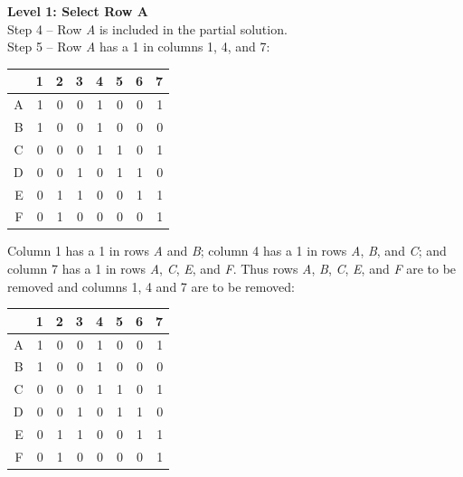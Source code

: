 \documentclass{mcmthesis}
\begin{document}
\textbf{Level 1: Select Row A} \\
\indent Step 4 -- Row \textit{A} is included in the partial solution.\\
\indent Step 5 -- Row \textit{A} has a 1 in columns 1, 4, and 7:

\begin{table}[ht]
\centering
	\begin{tabular}{|r|r|r|r|r|r|r|r|}
		\hline
		     & \textcolor[rgb]{0.00,0.00,0.98}1 & 2 & 3 & \textcolor[rgb]{0.00,0.00,0.98}4 & 5 & 6 & \textcolor[rgb]{0.00,0.00,0.98}7\\
		     \hline
		   \textcolor[rgb]{0.98,0.00,0.00}A & \textcolor[rgb]{0.98,0.00,0.00}1 & 0 & 0 & \textcolor[rgb]{0.98,0.00,0.00}1 & 0 & 0 & \textcolor[rgb]{0.98,0.00,0.00}1\\
		     \hline
		   B & 1 & 0 & 0 & 1 & 0 & 0 & 0\\
		     \hline
		   C & 0 & 0 & 0 & 1 & 1 & 0 & 1\\
		     \hline
		   D & 0 & 0 & 1 & 0 & 1 & 1 & 0\\
		     \hline
		   E & 0 & 1 & 1 & 0 & 0 & 1 & 1\\
		     \hline
		   F & 0 & 1 & 0 & 0 & 0 & 0 & 1\\
		\hline
	\end{tabular}
\end{table}

\indent Column 1 has a 1 in rows \textit{A} and \textit{B}; column 4 has a 1 in rows \textit{A}, \textit{B}, and \textit{C}; and column 7 has a 1 in rows \textit{A}, \textit{C}, \textit{E}, and \textit{F}. Thus rows \textit{A}, \textit{B}, \textit{C}, \textit{E}, and \textit{F} are to be removed and columns 1, 4 and 7 are to be removed:

\begin{table}[ht]
\centering
	\begin{tabular}{|r|r|r|r|r|r|r|r|}
		\hline
		     & \textcolor[rgb]{0.98,0.00,0.00}1 & 2 & 3 & \textcolor[rgb]{0.98,0.00,0.00}4 & 5 & 6 & \textcolor[rgb]{0.98,0.00,0.00}7\\
		     \hline
		   \textcolor[rgb]{0.00,0.00,0.98}A & \textcolor[rgb]{0.98,0.00,0.00}1 & 0 & 0 & \textcolor[rgb]{0.98,0.00,0.00}1 & 0 & 0 & \textcolor[rgb]{0.98,0.00,0.00}1\\
		     \hline
		   \textcolor[rgb]{0.00,0.00,0.98}B & \textcolor[rgb]{0.98,0.00,0.00}1 & 0 & 0 & \textcolor[rgb]{0.98,0.00,0.00}1 & 0 & 0 & 0\\
		     \hline
		   \textcolor[rgb]{0.00,0.00,0.98}C & 0 & 0 & 0 & \textcolor[rgb]{0.98,0.00,0.00}1 & 1 & 0 & \textcolor[rgb]{0.98,0.00,0.00}1\\
		     \hline
		   D & 0 & 0 & 1 & 0 & 1 & 1 & 0\\
		     \hline
		   \textcolor[rgb]{0.00,0.00,0.98}E & 0 & 1 & 1 & 0 & 0 & 1 & \textcolor[rgb]{0.98,0.00,0.00}1\\
		     \hline
		   \textcolor[rgb]{0.00,0.00,0.98}F & 0 & 1 & 0 & 0 & 0 & 0 & \textcolor[rgb]{0.98,0.00,0.00}1\\
		\hline
	\end{tabular}
\end{table}
\end{document}
